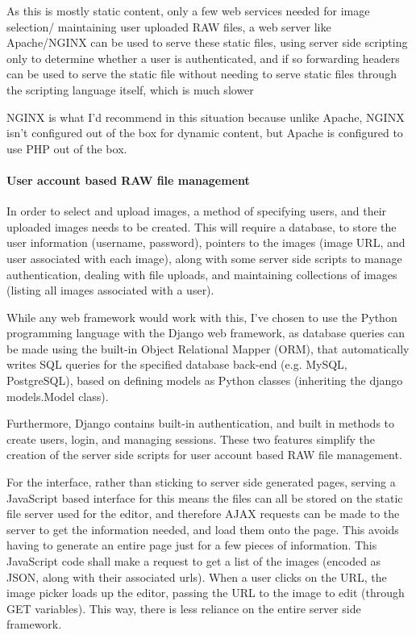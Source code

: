\documentclass[12pt,a4paper]{article}
\begin{document}
As this is mostly static content, only a few web services needed for image selection/
maintaining user uploaded RAW files, a web server like Apache/NGINX can be used to serve
these static files, using server side scripting only to determine whether a user is authenticated,
and if so forwarding headers can be used to serve the static file without needing to serve static files
through the scripting language itself, which is much slower

NGINX is what I'd recommend in this situation because unlike Apache, NGINX isn't
configured out of the box for dynamic content, but Apache is configured to use PHP
out of the box.

\paragraph{User account based RAW file management}
In order to select and upload images, a method of specifying users, and their uploaded
images needs to be created. This will require a database, to store the user information (username,
password), pointers to the images (image URL, and user associated with each image), along with some
server side scripts to manage authentication, dealing with file uploads, and maintaining collections
of images (listing all images associated with a user).

While any web framework would work with this, I've chosen to use the Python programming
language with the Django web framework, as database queries can be made using the built-in
Object Relational Mapper (ORM), that automatically writes SQL queries for the specified
database back-end (e.g. MySQL, PostgreSQL), based on defining models as Python classes (inheriting
the django models.Model class).

Furthermore, Django contains built-in authentication, and built in methods to create users,
login, and managing sessions. These two features simplify the creation of the server side scripts
for user account based RAW file management.

For the interface, rather than sticking to server side generated pages, serving a JavaScript based
interface for this means the files can all be stored on the static file server used for the editor,
and therefore AJAX requests can be made to the server to get the information needed, and load them
onto the page. This avoids having to generate an entire page just for a few pieces of information. This
JavaScript code shall make a request to get a list of the images (encoded as JSON, along with their associated
urls). When a user clicks on the URL, the image picker loads up the editor, passing the URL to the image to edit (through
GET variables). This way, there is less reliance on the entire server side framework.
\end{document}

